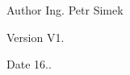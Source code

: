 \begin{DoxyAuthor}{Author}
Ing. Petr Simek 
\end{DoxyAuthor}
\begin{DoxyVersion}{Version}
V1. 
\end{DoxyVersion}
\begin{DoxyDate}{Date}
16.. 
\end{DoxyDate}
